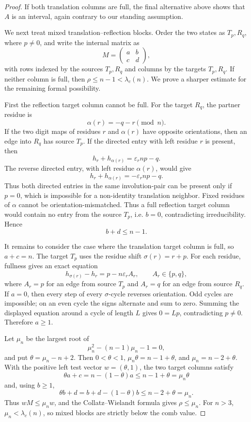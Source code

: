 \documentclass{amsart}
\theoremstyle{definition}
\theoremstyle{remark}
\begin{document}
\begin{proof}
If both translation columns are full, the final alternative above shows
that \(A\) is an interval, again contrary to our standing assumption.

We next treat mixed translation--reflection blocks.  Order the two
states as \(T_p,R_q\), where \(p\ne0\), and write the internal matrix as
\[
  M=\begin{pmatrix}a&b\\ c&d\end{pmatrix},
\]
with rows indexed by the sources \(T_p,R_q\) and columns by the targets
\(T_p,R_q\).  If neither column is full, then \(\rho\le n-1<\lambda_c(n)\).
We prove a sharper estimate for the remaining formal possibility.

First the reflection target column cannot be full.  For the target
\(R_q\), the partner residue is
\[
  \alpha(r)=-q-r\pmod n .
\]
If the two digit maps of residues \(r\) and \(\alpha(r)\) have opposite
orientations, then an edge into \(R_q\) has source \(T_p\).  If the
directed entry with left residue \(r\) is present, then
\[
  h_r+h_{\alpha(r)}=\varepsilon_r n p-q .
\]
The reverse directed entry, with left residue \(\alpha(r)\), would give
\[
  h_r+h_{\alpha(r)}=-\varepsilon_r n p-q .
\]
Thus both directed entries in the same involution-pair can be present
only if \(p=0\), which is impossible for a non-identity translation
neighbor.  Fixed residues of \(\alpha\) cannot be orientation-mismatched.
Thus a full reflection target column would contain no entry from the
source \(T_p\), i.e. \(b=0\), contradicting irreducibility.  Hence
\[
  b+d\le n-1 .
\]

It remains to consider the case where the translation target column is
full, so \(a+c=n\).  The target \(T_p\) uses the residue shift
\(\sigma(r)=r+p\).  For each residue, fullness gives an exact equation
\[
  h_{\sigma(r)}-h_r=p-n\varepsilon_r A_r,
  \qquad A_r\in\{p,q\},
\]
where \(A_r=p\) for an edge from source \(T_p\) and \(A_r=q\) for an
edge from source \(R_q\).  If \(a=0\), then every step of every
\(\sigma\)-cycle reverses orientation.  Odd cycles are impossible; on an
even cycle the signs alternate and sum to zero.  Summing the displayed
equation around a cycle of length \(L\) gives \(0=Lp\), contradicting
\(p\ne0\).  Therefore \(a\ge1\).

Let \(\mu_n\) be the largest root of
\[
  \mu_n^2-(n-1)\mu_n-1=0,
\]
and put \(\theta=\mu_n-n+2\).  Then \(0<\theta<1\),
\(\mu_n\theta=n-1+\theta\), and \(\mu_n=n-2+\theta\).  With the positive
left test vector \(w=(\theta,1)\), the two target columns satisfy
\[
  \theta a+c=n-(1-\theta)a\le n-1+\theta=\mu_n\theta
\]
and, using \(b\ge1\),
\[
  \theta b+d=b+d-(1-\theta)b\le n-2+\theta=\mu_n .
\]
Thus \(wM\le\mu_n w\), and the Collatz--Wielandt formula gives
\(\rho\le\mu_n\).  For \(n>3\), \(\mu_n<\lambda_c(n)\), so mixed blocks
are strictly below the comb value.


\end{proof}
\end{document}
